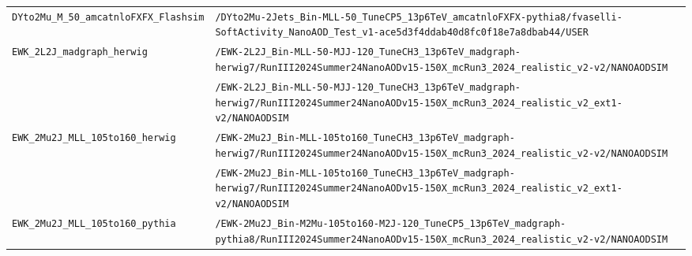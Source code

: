\begin{longtable}{@{}>{\RaggedRight\arraybackslash}p{} >{\RaggedRight\arraybackslash}p{}@{}}
\addlinespace[2pt]
\texttt{DYto2Mu\_\allowbreak{}M\_\allowbreak{}50\_\allowbreak{}amcatnloFXFX\_\allowbreak{}Flashsim} & \texttt{/\allowbreak{}DYto2Mu-\allowbreak{}2Jets\_\allowbreak{}Bin-\allowbreak{}MLL-\allowbreak{}50\_\allowbreak{}TuneCP5\_\allowbreak{}13p6TeV\_\allowbreak{}amcatnloFXFX-\allowbreak{}pythia8/\allowbreak{}fvaselli-\allowbreak{}SoftActivity\_\allowbreak{}NanoAOD\_\allowbreak{}Test\_\allowbreak{}v1-\allowbreak{}ace5d3f4ddab40d8fc0f18e7a8dbab44/\allowbreak{}USER} \\
\addlinespace[2pt]
\texttt{EWK\_\allowbreak{}2L2J\_\allowbreak{}madgraph\_\allowbreak{}herwig} & \texttt{/\allowbreak{}EWK-\allowbreak{}2L2J\_\allowbreak{}Bin-\allowbreak{}MLL-\allowbreak{}50-\allowbreak{}MJJ-\allowbreak{}120\_\allowbreak{}TuneCH3\_\allowbreak{}13p6TeV\_\allowbreak{}madgraph-\allowbreak{}herwig7/\allowbreak{}RunIII2024Summer24NanoAODv15-\allowbreak{}150X\_\allowbreak{}mcRun3\_\allowbreak{}2024\_\allowbreak{}realistic\_\allowbreak{}v2-\allowbreak{}v2/\allowbreak{}NANOAODSIM} \\
 & \texttt{/\allowbreak{}EWK-\allowbreak{}2L2J\_\allowbreak{}Bin-\allowbreak{}MLL-\allowbreak{}50-\allowbreak{}MJJ-\allowbreak{}120\_\allowbreak{}TuneCH3\_\allowbreak{}13p6TeV\_\allowbreak{}madgraph-\allowbreak{}herwig7/\allowbreak{}RunIII2024Summer24NanoAODv15-\allowbreak{}150X\_\allowbreak{}mcRun3\_\allowbreak{}2024\_\allowbreak{}realistic\_\allowbreak{}v2\_\allowbreak{}ext1-\allowbreak{}v2/\allowbreak{}NANOAODSIM} \\
\addlinespace[2pt]
\texttt{EWK\_\allowbreak{}2Mu2J\_\allowbreak{}MLL\_\allowbreak{}105to160\_\allowbreak{}herwig} & \texttt{/\allowbreak{}EWK-\allowbreak{}2Mu2J\_\allowbreak{}Bin-\allowbreak{}MLL-\allowbreak{}105to160\_\allowbreak{}TuneCH3\_\allowbreak{}13p6TeV\_\allowbreak{}madgraph-\allowbreak{}herwig7/\allowbreak{}RunIII2024Summer24NanoAODv15-\allowbreak{}150X\_\allowbreak{}mcRun3\_\allowbreak{}2024\_\allowbreak{}realistic\_\allowbreak{}v2-\allowbreak{}v2/\allowbreak{}NANOAODSIM} \\
 & \texttt{/\allowbreak{}EWK-\allowbreak{}2Mu2J\_\allowbreak{}Bin-\allowbreak{}MLL-\allowbreak{}105to160\_\allowbreak{}TuneCH3\_\allowbreak{}13p6TeV\_\allowbreak{}madgraph-\allowbreak{}herwig7/\allowbreak{}RunIII2024Summer24NanoAODv15-\allowbreak{}150X\_\allowbreak{}mcRun3\_\allowbreak{}2024\_\allowbreak{}realistic\_\allowbreak{}v2\_\allowbreak{}ext1-\allowbreak{}v2/\allowbreak{}NANOAODSIM} \\
\addlinespace[2pt]
\texttt{EWK\_\allowbreak{}2Mu2J\_\allowbreak{}MLL\_\allowbreak{}105to160\_\allowbreak{}pythia} & \texttt{/\allowbreak{}EWK-\allowbreak{}2Mu2J\_\allowbreak{}Bin-\allowbreak{}M2Mu-\allowbreak{}105to160-\allowbreak{}M2J-\allowbreak{}120\_\allowbreak{}TuneCP5\_\allowbreak{}13p6TeV\_\allowbreak{}madgraph-\allowbreak{}pythia8/\allowbreak{}RunIII2024Summer24NanoAODv15-\allowbreak{}150X\_\allowbreak{}mcRun3\_\allowbreak{}2024\_\allowbreak{}realistic\_\allowbreak{}v2-\allowbreak{}v2/\allowbreak{}NANOAODSIM} \\

\end{longtable}
